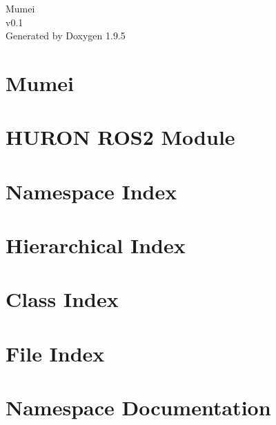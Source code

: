 \documentclass[twoside]{book}
\newcommand{\+}{\discretionary{\mbox{\scriptsize$\hookleftarrow$}}{}{}}
\newcommand{\clearemptydoublepage}{%
    \newpage{\pagestyle{empty}\cleardoublepage}%
  }
\begin{document}
  \raggedbottom
    \hypersetup{pageanchor=false,
                bookmarksnumbered=true,
                pdfencoding=unicode
               }
  \begin{titlepage}
  \vspace*{7cm}
  \begin{center}%
  {\Large Mumei}\\
  [1ex]\large v0.\+1 \\
  \vspace*{1cm}
  {\large Generated by Doxygen 1.9.5}\\
  \end{center}
  \end{titlepage}
  \clearemptydoublepage
  \tableofcontents
  \clearemptydoublepage
  \hypersetup{pageanchor=true}
\chapter{Mumei}
\label{index}\hypertarget{index}{}
\chapter{HURON ROS2 Module}
\label{md__github_workspace_ros2_src_README}

\chapter{Namespace Index}

\chapter{Hierarchical Index}

\chapter{Class Index}

\chapter{File Index}

\chapter{Namespace Documentation}

\end{document}
